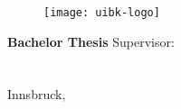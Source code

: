 \pagestyle{empty}


\begin{titlepage}
\rule{0mm}{1mm}
\vspace*{10mm}

\begin{center}
	\begin{figure}
		\centering
		\texttt{[image: uibk-logo]}
	\end{figure}	
	\vskip 25mm
	{\LARGE\bf \MTitle}
	\vskip 5mm
	\vskip 1cm
	{\Large \textbf{\MAuthor}}\vskip 15mm
	\vskip 15mm
	\textbf{\large Bachelor Thesis}    
	\vskip 3cm
	{\large Supervisor:\\}
	{\MSupervisor\\}
	{\large \MInstitution\\}
	{\large \MOrg}    
	\vfill
	{\large Innsbruck, \MDate} 
\end{center}
\end{titlepage} 

\ClearShipoutPicture
